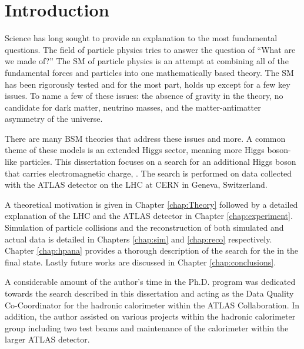 \chapter{Introduction}\label{chap:Intro}
	Science has long sought to provide an explanation to the most fundamental questions. The field of particle physics tries to answer  the question of ``What are we made of?'' The \gls{SM} of particle physics is an attempt at combining all of the fundamental forces and particles into one mathematically based theory. The \gls{SM} has been rigorously tested and for the most part, holds up except for a few key issues. To name a few of these issues: the absence of gravity in the theory, no candidate for dark matter, neutrino masses, and the matter-antimatter asymmetry of the universe.

	There are many \gls{BSM} theories that address these issues and more. A common theme of these models is an extended Higgs sector, meaning more Higgs boson-like particles. This dissertation focuses on a search for an additional Higgs boson that carries electromagnetic charge, \Hpm. The search is performed on data collected with the \acrshort{ATLAS} detector on the \gls{LHC} at \gls{CERN} in Geneva, Switzerland. 

	A theoretical motivation is given in Chapter \ref{chap:Theory} followed by a detailed explanation of the \gls{LHC} and the \gls{ATLAS} detector in Chapter \ref{chap:experiment}. Simulation of particle collisions and the reconstruction of both simulated and actual data is detailed in Chapters \ref{chap:sim} and \ref{chap:reco} respectively. Chapter \ref{chap:hpana} provides a thorough description of the search for the \Hpm in the \taunu final state. Lastly future works are discussed in Chapter \ref{chap:conclusions}.

	A considerable amount of the author's time in the Ph.D. program was dedicated towards the search described in this dissertation and acting as the Data Quality Co-Coordinator for the hadronic calorimeter within the \gls{ATLAS} Collaboration. In addition, the author assisted on various projects within the hadronic calorimeter group including two test beams and maintenance of the calorimeter within the larger ATLAS detector.
